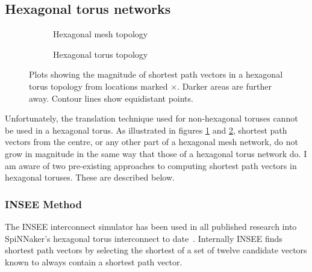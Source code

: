 		\subsection{Hexagonal torus networks}
			
			\begin{figure}
				\center
				
				\begin{subfigure}{\linewidth}
					\center
					\caption{Hexagonal mesh topology}
					\label{fig:distance-map-hex-mesh}
				\end{subfigure}
				
				\vspace{1em}
				
				\begin{subfigure}{\linewidth}
					\center
					\caption{Hexagonal torus topology}
					\label{fig:distance-map-hex-torus}
				\end{subfigure}
				
				\caption[Magnitudes of shortest path vectors in a hexagonal torus.]%
				{Plots showing the magnitude of shortest path vectors in a hexagonal
				torus topology from locations marked {\color{red}$\times$}.  Darker
				areas are further away. Contour lines show equidistant points.}
				
				\label{fig:distance-map-hex}
			\end{figure}
			
			Unfortunately, the translation technique used for non-hexagonal toruses
			cannot be used in a hexagonal torus. As illustrated in figures
			\ref{fig:distance-map-hex-mesh} and \ref{fig:distance-map-hex-torus},
			shortest path vectors from the centre, or any other part of a hexagonal
			mesh network, do not grow in magnitude in the same way that those of a
			hexagonal torus network do. I am aware of two pre-existing approaches to
			computing shortest path vectors in hexagonal toruses. These are described
			below.
			
			\subsubsection{INSEE Method}
			
				The INSEE interconnect simulator has been used in all published
				research into SpiNNaker's hexagonal torus interconnect to
				date~\cite{navaridas09,ghasempour15}. Internally INSEE finds shortest
				path vectors by selecting the shortest of a set of twelve candidate
				vectors known to always contain a shortest path vector.
				

